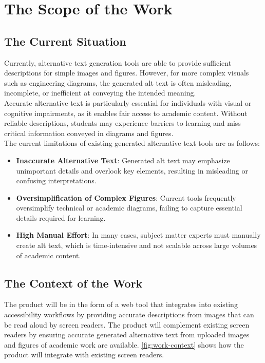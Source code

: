 \documentclass[12pt]{article}
\begin{document}
\section{The Scope of the Work}
\subsection{The Current Situation}
Currently, alternative text generation tools are able to provide sufficient descriptions for simple images and figures. However, for more complex visuals 
such as engineering diagrams, the generated alt text is often misleading, incomplete, or inefficient at conveying the intended meaning.\\
Accurate alternative text is particularly essential for individuals with visual or cognitive impairments, as it enables fair access to academic content. Without 
reliable descriptions, students may experience barriers to learning and miss critical information conveyed in diagrams and figures.\\
The current limitations of existing generated alternative text tools are as follows:
\begin{itemize}
  \item \textbf{Inaccurate Alternative Text}: Generated alt text may emphasize unimportant details and overlook key elements, 
  resulting in misleading or confusing interpretations.
  \item \textbf{Oversimplification of Complex Figures}: Current tools frequently oversimplify technical or academic diagrams, 
  failing to capture essential details required for learning.
  \item \textbf{High Manual Effort}: In many cases, subject matter experts must manually create alt text, 
  which is time-intensive and not scalable across large volumes of academic content.
\end{itemize}

\subsection{The Context of the Work}
The product will be in the form of a web tool that integrates into existing accessibility workflows
by providing accurate descriptions from images that can be read aloud by screen readers. The product 
will complement existing screen readers by ensuring accurate generated alternative text from 
uploaded images and figures of academic work are available. \autoref{fig:work-context} shows 
how the product will integrate with existing screen readers.
\end{document}
